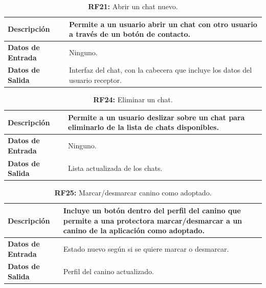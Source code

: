 \documentclass[a4paper, 12pt]{article}
\begin{document}
\begin{table}[H]
\captionsetup{list=no}%
\captionsetup{justification=raggedright,singlelinecheck=false}
\captionsetup{labelformat=empty}
\caption*{\textbf{RF21:} Abrir un chat nuevo.}
\label{tab:RF21}
	\begin{tabular}{|m{5cm}|m{10cm}|}
	\hline
	\textbf{Descripción} & Permite a un usuario abrir un chat con otro usuario a través de un botón de contacto. \\ 
	\hline
	\textbf{Datos de Entrada} & Ninguno. \\ 
	\hline
	\textbf{Datos de Salida} & Interfaz del chat, con la cabecera que incluye los datos del usuario receptor. \\ 
	\hline
\end{tabular}
\end{table}

\begin{table}[H]
\captionsetup{list=no}%
\captionsetup{justification=raggedright,singlelinecheck=false}
\captionsetup{labelformat=empty}
\caption*{\textbf{RF24:} Eliminar un chat.}
\label{tab:RF24}
	\begin{tabular}{|m{5cm}|m{10cm}|}
	\hline
	\textbf{Descripción} & Permite a un usuario deslizar sobre un chat para eliminarlo de la lista de chats disponibles. \\ 
	\hline
	\textbf{Datos de Entrada} & Ninguno. \\ 
	\hline
	\textbf{Datos de Salida} & Lista actualizada de los chats. \\ 
	\hline
\end{tabular}
\end{table}

\begin{table}[H]
\captionsetup{list=no}%
\captionsetup{justification=raggedright,singlelinecheck=false}
\captionsetup{labelformat=empty}
\caption*{\textbf{RF25:} Marcar/desmarcar canino como adoptado.}
\label{tab:RF25}
	\begin{tabular}{|m{5cm}|m{10cm}|}
	\hline
	\textbf{Descripción} & Incluye un botón dentro del perfil del canino que permite a una protectora marcar/desmarcar a un canino de la aplicación como adoptado. \\ 
	\hline
	\textbf{Datos de Entrada} & Estado nuevo según si se quiere marcar o desmarcar. \\ 
	\hline
	\textbf{Datos de Salida} & Perfil del canino actualizado. \\ 
	\hline
\end{tabular}
\end{table}
\end{document}
